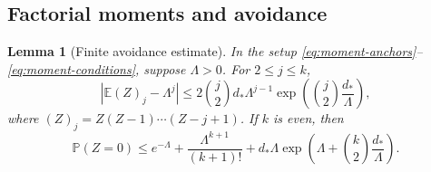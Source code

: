 \documentclass[11pt,a4paper]{article}
\numberwithin{equation}{section}
\newtheorem{lemma}[theorem]{Lemma}
\theoremstyle{definition}
\theoremstyle{remark}
\newcommand{\E}{\mathbb E}
\newcommand{\Prob}{\mathbb P}
\begin{document}
\subsection{Factorial moments and avoidance}
\begin{lemma}[Finite avoidance estimate]\label{lem:avoidance}
In the setup \eqref{eq:moment-anchors}--\eqref{eq:moment-conditions}, suppose $\Lambda>0$. For $2\le j\le k$,
\begin{equation}\label{eq:factorial-error}
 \left|\E(Z)_j-\Lambda^j\right|
 \le2\binom j2d_*\Lambda^{j-1}
       \exp\left(\binom j2\frac{d_*}{\Lambda}\right),
\end{equation}
where $(Z)_j=Z(Z-1)\cdots(Z-j+1)$. If $k$ is even, then
\begin{equation}\label{eq:avoidance}
 \Prob(Z=0)\le e^{-\Lambda}+\frac{\Lambda^{k+1}}{(k+1)!}
       +d_*\Lambda\exp\left(\Lambda+\binom k2\frac{d_*}{\Lambda}\right).
\end{equation}
\end{lemma}
\end{document}
